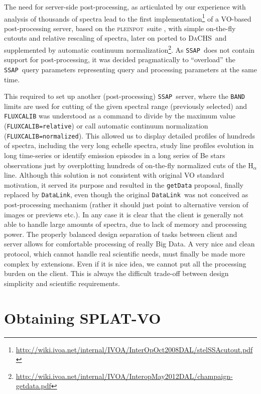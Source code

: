 \documentclass[final,authoryear,5p,times,twocolumn]{elsarticle}
\newcommand{\datalink}{\texttt{DataLink}}
\newcommand{\ssap}{\texttt{SSAP}}
\newcommand{\dachs}{\textsc{DaCHS}}
\newcommand{\pleinpot}{\textsc{pleinpot}}
\begin{document}
The need for server-side post-processing, as articulated by our
experience with analysis of thousands of spectra lead to the first
implementation\footnote{\url{http://wiki.ivoa.net/internal/IVOA/InterOpOct2008DAL/stelSSAcutout.pdf}}
of a VO-based post-processing server, based on the \pleinpot\ suite
\citep{2005ASPC..347..385C}, with simple on-the-fly cutouts and
relative rescaling of spectra, later on ported to \dachs\ and
supplemented by automatic continuum
normalization\footnote{\url{http://wiki.ivoa.net/internal/IVOA/InteropMay2012DAL/champaign-getdata.pdf}}.
As \ssap\ does not contain support for post-processing, it was decided
pragmatically to ``overload'' the \ssap\ query parameters representing
query and processing parameters at the same time.

This required to set up another (post-processing) \ssap\ server, where
the \texttt{BAND} limits are used for cutting of the given spectral
range (previously selected) and \texttt{FLUXCALIB} was understood as a
command to divide by the maximum value (\texttt{FLUXCALIB=relative})
or call automatic continuum normalization
(\texttt{FLUXCALIB=normalized}).  This allowed us to display detailed
profiles of hundreds of spectra, including the very long echelle
spectra, study line profiles evolution in long time-series or identify
emission episodes in a long series of Be stars observations just by
overplotting hundreds of on-the-fly normalized cuts of the H$_\alpha$
line.  Although this solution is not consistent with original VO
standard motivation, it served its purpose and resulted in the
\texttt{getData} proposal, finally replaced by \datalink, even though
the original \datalink\ was not conceived as post-processing mechanism
(rather it should just point to alternative version of images or
previews etc.).  In any case it is clear that the client is generally
not able to handle large amounts of spectra, due to lack of memory and
processing power. The properly balanced design separation of tasks
between client and server allows for comfortable processing of really
Big Data.  A very nice and clean protocol, which cannot handle real
scientific needs, must finally be made more complex by
extensions. Even if it is nice idea, we cannot put all the processing
burden on the client.  This is always the difficult trade-off between
design simplicity and scientific requirements.

\section{Obtaining SPLAT-VO}
\end{document}
